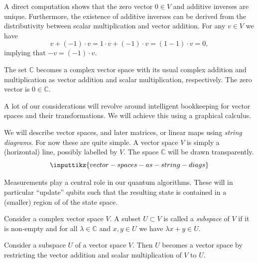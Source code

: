 \documentclass[a4paper,oneside, 12pt]{amsart}
\begin{document}
A direct computation shows that the zero vector \( 0 \in V \) and additive inverses are unique.
Furthermore, the existence of additive inverses can be derived from  the distributivity between scalar multiplication and vector addition.
For any \(v\in V\) we have
\begin{equation*}
  v + (-1)\cdot v = 1\cdot v + (-1) \cdot v = (1 -1) \cdot v = 0,
\end{equation*}
implying that \(-v = (-1)\cdot v\).

\begin{example}\label{ex:one-dim-vector-space}
  The set \( \mathbb{C} \) becomes a complex vector space with its usual complex addition and multiplication as vector addition and scalar multiplication, respectively.
  The zero vector is \( 0 \in \mathbb{C} \).
\end{example}

A lot of our considerations will revolve around intelligent bookkeeping for vector spaces and their transformations.
We will achieve this using a graphical calculus.
\begin{notation}\label{not:string-diagrams.}
  We will describe vector spaces, and later matrices, or linear maps using \emph{string diagrams}.
  For now these are quite simple.
  A vector space \(V\) is simply a (horizontal) line, possibly labelled by \(V\).
  The space \( \mathbb{C}\) will be drawn transparently.
  \begin{equation}
    \inputtikz{vector-spaces-as-string-diags}
  \end{equation}
\end{notation}

Measurements play a central role in our quantum algorithms.
These will in particular ``update'' qubits such that the resulting state is contained in a (smaller) region of  of the state space.

\begin{definition}\label{def:subspace-space}
  Consider a complex vector space \(V\).
  A subset \(U\subset V\) is called a \emph{subspace} of \(V\) if it is non-empty and for all \(\lambda
  \in \mathbb{C} \) and \(x,y \in U\) we have \(\lambda x+y \in U\).
\end{definition}

\begin{proposition}\label{prop:sub-are-vs}
  Consider a subspace \(U\) of a vector space \(V\).
  Then \(U\) becomes a vector space by restricting the vector addition and scalar multiplication of \(V\) to \(U\).
\end{proposition}
\end{document}
